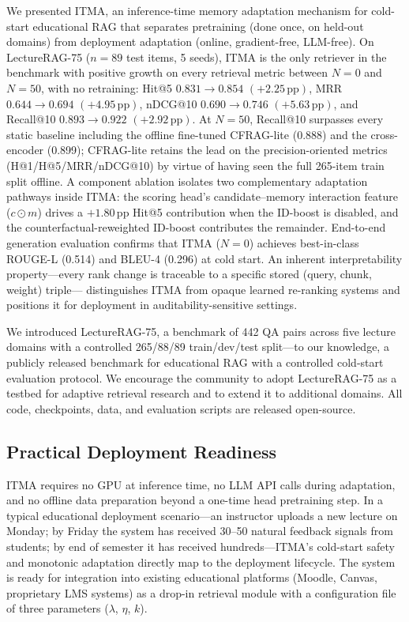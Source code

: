 \documentclass[journal]{IEEEtran}
\begin{document}
We presented ITMA, an inference-time memory adaptation mechanism for
cold-start educational RAG that separates pretraining (done once, on
held-out domains) from deployment adaptation (online, gradient-free,
LLM-free).  On LectureRAG-75 ($n{=}89$ test items, 5 seeds), ITMA is
the only retriever in the benchmark with positive growth on every
retrieval metric between $N{=}0$ and $N{=}50$, with no retraining:
Hit@5 $0.831\rightarrow 0.854$ $(+2.25\,\text{pp})$,
MRR $0.644\rightarrow 0.694$ $(+4.95\,\text{pp})$,
nDCG@10 $0.690\rightarrow 0.746$ $(+5.63\,\text{pp})$, and
Recall@10 $0.893\rightarrow 0.922$ $(+2.92\,\text{pp})$.  At
$N{=}50$, Recall@10 surpasses every static baseline including the
offline fine-tuned CFRAG-lite (0.888) and the cross-encoder (0.899);
CFRAG-lite retains the lead on the precision-oriented metrics
(H@1/H@5/MRR/nDCG@10) by virtue of having seen the full 265-item
train split offline.  A component ablation isolates two complementary
adaptation pathways inside ITMA: the scoring head's candidate--memory
interaction feature ($c{\odot}m$) drives a $+1.80\,\text{pp}$ Hit@5
contribution when the ID-boost is disabled, and the
counterfactual-reweighted ID-boost contributes the remainder.
End-to-end generation evaluation confirms that ITMA ($N{=}0$)
achieves best-in-class ROUGE-L (0.514) and BLEU-4 (0.296) at cold
start.  An inherent interpretability property---every rank change is
traceable to a specific stored (query, chunk, weight) triple---%
distinguishes ITMA from opaque learned re-ranking systems and
positions it for deployment in auditability-sensitive settings.

We introduced LectureRAG-75, a benchmark of 442 QA pairs across five
lecture domains with a controlled 265/88/89 train/dev/test split---to
our knowledge, a publicly released benchmark for educational RAG with
a controlled cold-start evaluation protocol.  We encourage the
community to adopt LectureRAG-75 as a testbed for adaptive retrieval
research and to extend it to additional domains.  All code,
checkpoints, data, and evaluation scripts are released open-source.

\subsection{Practical Deployment Readiness}
ITMA requires no GPU at inference time, no LLM API calls during
adaptation, and no offline data preparation beyond a one-time head
pretraining step.  In a typical educational deployment
scenario---an instructor uploads a new lecture on Monday; by Friday
the system has received 30--50 natural feedback signals from students;
by end of semester it has received hundreds---ITMA's cold-start
safety and monotonic adaptation directly map to the deployment
lifecycle.  The system is ready for integration into existing
educational platforms (Moodle, Canvas, proprietary LMS systems) as a
drop-in retrieval module with a configuration file of three
parameters ($\lambda$, $\eta$, $k$).
\end{document}
